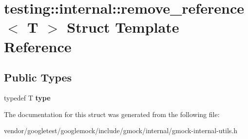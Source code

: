 \hypertarget{structtesting_1_1internal_1_1remove__reference}{}\section{testing\+:\+:internal\+:\+:remove\+\_\+reference$<$ T $>$ Struct Template Reference}
\label{structtesting_1_1internal_1_1remove__reference}
\subsection*{Public Types}
\begin{DoxyCompactItemize}
\item 
typedef T {\bfseries type}\hypertarget{structtesting_1_1internal_1_1remove__reference_a291edca52c59a0d211977d4802439b8a}{}\label{structtesting_1_1internal_1_1remove__reference_a291edca52c59a0d211977d4802439b8a}

\end{DoxyCompactItemize}


The documentation for this struct was generated from the following file\+:\begin{DoxyCompactItemize}
\item 
vendor/googletest/googlemock/include/gmock/internal/gmock-\/internal-\/utils.\+h\end{DoxyCompactItemize}
